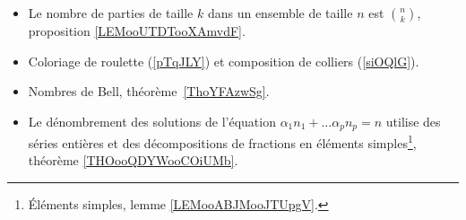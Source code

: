 	\label{THEMEooDenombrements}
\begin{itemize}
	\item
	      Le nombre de parties de taille \( k\) dans un ensemble de taille \( n\) est \( \binom{ n }{ k }\), proposition \ref{LEMooUTDTooXAmvdF}.
	\item Coloriage de roulette (\ref{pTqJLY}) et composition de colliers (\ref{siOQlG}).
	\item Nombres de Bell, théorème~\ref{ThoYFAzwSg}.
	\item Le dénombrement des solutions de l'équation \( \alpha_1 n_1+\ldots \alpha_pn_p=n\) utilise des séries entières et des décompositions de fractions en éléments simples\footnote{Éléments simples, lemme \ref{LEMooABJMooJTUpgV}.}, théorème \ref{THOooQDYWooCOiUMb}.
\end{itemize}
